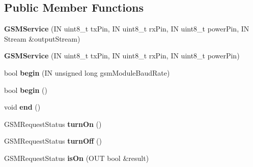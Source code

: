 \subsection*{Public Member Functions}
\begin{DoxyCompactItemize}
\item 
\mbox{\label{class_easyuino_1_1_g_s_m_service_ad8700c921a8f3ce267369e9843853be1}} 
{\bfseries G\+S\+M\+Service} (IN uint8\+\_\+t tx\+Pin, IN uint8\+\_\+t rx\+Pin, IN uint8\+\_\+t power\+Pin, IN Stream \&output\+Stream)
\item 
\mbox{\label{class_easyuino_1_1_g_s_m_service_ab856f1ecdb47de6b13f186bea7c69ce2}} 
{\bfseries G\+S\+M\+Service} (IN uint8\+\_\+t tx\+Pin, IN uint8\+\_\+t rx\+Pin, IN uint8\+\_\+t power\+Pin)
\item 
\mbox{\label{class_easyuino_1_1_g_s_m_service_a49dd695dba030b168464f620c3d96ee0}} 
bool {\bfseries begin} (IN unsigned long gsm\+Module\+Baud\+Rate)
\item 
\mbox{\label{class_easyuino_1_1_g_s_m_service_aeafc2dae47e4b13e127eb228a0f7ff6a}} 
bool {\bfseries begin} ()
\item 
\mbox{\label{class_easyuino_1_1_g_s_m_service_a05bef783773776ec209608aa81d1ff45}} 
void {\bfseries end} ()
\item 
\mbox{\label{class_easyuino_1_1_g_s_m_service_ad5bd54c7dfcc402df0fac92c88e07c6e}} 
G\+S\+M\+Request\+Status {\bfseries turn\+On} ()
\item 
\mbox{\label{class_easyuino_1_1_g_s_m_service_a327c2610c2aa7ba5a54530d87a0d6128}} 
G\+S\+M\+Request\+Status {\bfseries turn\+Off} ()
\item 
\mbox{\label{class_easyuino_1_1_g_s_m_service_a2ad440efbd04942d956212988d20a0df}} 
G\+S\+M\+Request\+Status {\bfseries is\+On} (O\+UT bool \&result)
\item 
\mbox{\label{class_easyuino_1_1_g_s_m_service_a6b6ee723ceaf62bfd9312278b5dbf36d}} 

\end{DoxyCompactItemize}
